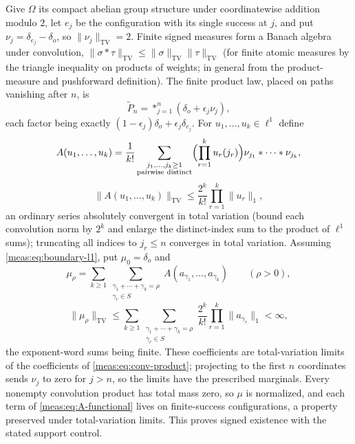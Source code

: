 \documentclass[11pt]{article}
\numberwithin{equation}{section}
\theoremstyle{definition}
\theoremstyle{remark}
\newcommand{\TV}{\mathrm{TV}}
\newcommand{\norm}[1]{\lVert#1\rVert}
\begin{document}
Give $\Omega$ its compact abelian group structure under coordinatewise addition
modulo $2$, let $e_j$ be the configuration with its single success at $j$, and
put $\nu_j=\delta_{e_j}-\delta_o$, so $\norm{\nu_j}_\TV=2$. Finite signed measures form
a Banach algebra under convolution, $\norm{\sigma*\tau}_\TV\le\norm\sigma_\TV\norm\tau_\TV$
(for finite atomic measures by the triangle inequality on products of weights;
in general from the product-measure and pushforward definition). The finite
product law, placed on paths vanishing after $n$, is
\begin{equation}\label{meas:eq:conv-product}
 \widetilde P_n=\mathop{\ast}_{j=1}^n(\delta_o+\epsilon_j\nu_j),
\end{equation}
each factor being exactly $(1-\epsilon_j)\delta_o+\epsilon_j\delta_{e_j}$. For
$u_1,\ldots,u_k\in\ell^1$ define
\begin{equation}\label{meas:eq:A-functional}
 A(u_1,\ldots,u_k)=\frac1{k!}\sum_{\substack{j_1,\ldots,j_k\ge1\\\text{pairwise distinct}}}
 \Bigl(\prod_{r=1}^ku_r(j_r)\Bigr)\nu_{j_1}\ast\cdots\ast\nu_{j_k},
\end{equation}
\begin{equation}\label{meas:eq:A-bound}
 \norm{A(u_1,\ldots,u_k)}_\TV\le\frac{2^k}{k!}\prod_{r=1}^k\norm{u_r}_1,
\end{equation}
an ordinary series absolutely convergent in total variation (bound each
convolution norm by $2^k$ and enlarge the distinct-index sum to the product of
$\ell^1$ sums); truncating all indices to $j_r\le n$ converges in total variation.
Assuming \eqref{meas:eq:boundary-l1}, put $\mu_0=\delta_o$ and
\begin{equation}\label{meas:eq:boundary-coefs}
 \mu_\rho=\sum_{k\ge1}\sum_{\substack{\gamma_1+\cdots+\gamma_k=\rho\\\gamma_r\in S}}
 A(a_{\gamma_1},\ldots,a_{\gamma_k})\qquad(\rho>0),
\end{equation}
\begin{equation}\label{meas:eq:boundary-bound}
 \norm{\mu_\rho}_\TV\le\sum_{k\ge1}\sum_{\substack{\gamma_1+\cdots+\gamma_k=\rho\\\gamma_r\in S}}
 \frac{2^k}{k!}\prod_{r=1}^k\norm{a_{\gamma_r}}_1<\infty ,
\end{equation}
the exponent-word sums being finite. These coefficients are total-variation
limits of the coefficients of \eqref{meas:eq:conv-product}; projecting to the
first $n$ coordinates sends $\nu_j$ to zero for $j>n$, so the limits have the
prescribed marginals. Every nonempty convolution product has total mass zero,
so $\mu$ is normalized, and each term of \eqref{meas:eq:A-functional} lives on
finite-success configurations, a property preserved under total-variation
limits. This proves signed existence with the stated support control.
\end{document}

